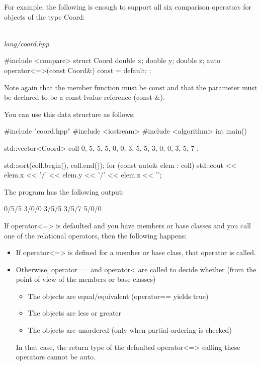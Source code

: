 For example, the following is enough to support all six comparison operators for objects of the type Coord:

\noindent
\hspace*{\fill} \\ %
\textit{lang/coord.hpp}

\begin{cpp}
#include <compare>
struct Coord {
	double x{};
	double y{};
	double z{};
	auto operator<=>(const Coord&) const = default;
};
\end{cpp}

Note again that the member function must be const and that the parameter must be declared to be a const lvalue reference (const \&).

You can use this data structure as follows:


\begin{cpp}
#include "coord.hpp"
#include <iostream>
#include <algorithm>
int main()
{
	std::vector<Coord> coll{ {0, 5, 5}, {5, 0, 0}, {3, 5, 5},
							 {3, 0, 0}, {3, 5, 7} };
							 
	std::sort(coll.begin(), coll.end());
	for (const auto& elem : coll) {
		std::cout << elem.x << '/' << elem.y << '/' << elem.z << '\n';
	}
}
\end{cpp}

The program has the following output:

\begin{shell}
0/5/5
3/0/0
3/5/5
3/5/7
5/0/0
\end{shell}


If operator<=> is defaulted and you have members or base classes and you call one of the relational operators, then the following happens:

\begin{itemize}
\item
If operator<=> is defined for a member or base class, that operator is called.

\item
Otherwise, operator== and operator< are called to decide whether (from the point of view of the members or base classes)

\begin{itemize}
\item
The objects are equal/equivalent (operator== yields true)

\item
The objects are less or greater

\item
The objects are unordered (only when partial ordering is checked)
\end{itemize}

In that case, the return type of the defaulted operator<=> calling these operators cannot be auto.
\end{itemize}

